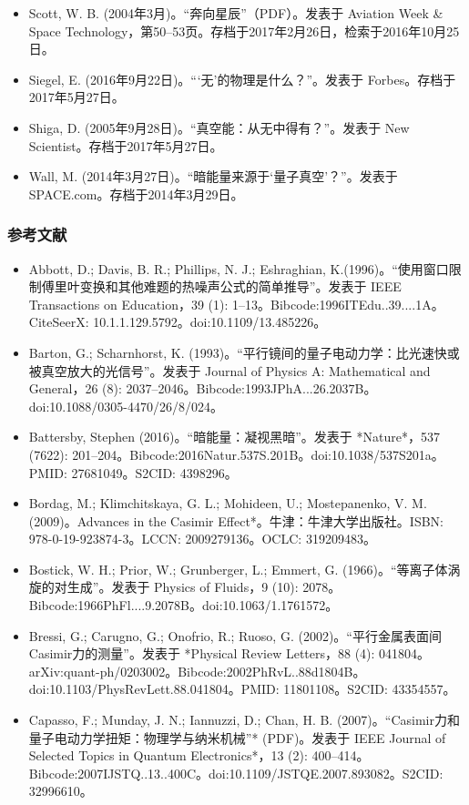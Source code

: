 \begin{itemize}
\item Scott, W. B. (2004年3月)。“奔向星辰”（PDF）。发表于 Aviation Week & Space Technology，第50–53页。存档于2017年2月26日，检索于2016年10月25日。
\item Siegel, E. (2016年9月22日)。“‘无’的物理是什么？”。发表于 Forbes。存档于2017年5月27日。
\item Shiga, D. (2005年9月28日)。“真空能：从无中得有？”。发表于 New Scientist。存档于2017年5月27日。
\item Wall, M. (2014年3月27日)。“暗能量来源于‘量子真空’？”。发表于 SPACE.com。存档于2014年3月29日。
\end{itemize}
\subsubsection{参考文献}
\begin{itemize}
\item Abbott, D.; Davis, B. R.; Phillips, N. J.; Eshraghian, K.(1996)。“使用窗口限制傅里叶变换和其他难题的热噪声公式的简单推导”。发表于 IEEE Transactions on Education，39 (1): 1–13。Bibcode:1996ITEdu..39....1A。CiteSeerX: 10.1.1.129.5792。doi:10.1109/13.485226。
\item Barton, G.; Scharnhorst, K. (1993)。“平行镜间的量子电动力学：比光速快或被真空放大的光信号”。发表于 Journal of Physics A: Mathematical and General，26 (8): 2037–2046。Bibcode:1993JPhA...26.2037B。doi:10.1088/0305-4470/26/8/024。
\item Battersby, Stephen (2016)。“暗能量：凝视黑暗”。发表于 *Nature*，537 (7622): 201–204。Bibcode:2016Natur.537S.201B。doi:10.1038/537S201a。PMID: 27681049。S2CID: 4398296。
\item Bordag, M.; Klimchitskaya, G. L.; Mohideen, U.; Mostepanenko, V. M. (2009)。Advances in the Casimir Effect*。牛津：牛津大学出版社。ISBN: 978-0-19-923874-3。LCCN: 2009279136。OCLC: 319209483。
\item Bostick, W. H.; Prior, W.; Grunberger, L.; Emmert, G. (1966)。“等离子体涡旋的对生成”。发表于 Physics of Fluids，9 (10): 2078。Bibcode:1966PhFl....9.2078B。doi:10.1063/1.1761572。
\item Bressi, G.; Carugno, G.; Onofrio, R.; Ruoso, G. (2002)。“平行金属表面间Casimir力的测量”。发表于 *Physical Review Letters，88 (4): 041804。arXiv:quant-ph/0203002。Bibcode:2002PhRvL..88d1804B。doi:10.1103/PhysRevLett.88.041804。PMID: 11801108。S2CID: 43354557。
\item Capasso, F.; Munday, J. N.; Iannuzzi, D.; Chan, H. B. (2007)。“Casimir力和量子电动力学扭矩：物理学与纳米机械”* (PDF)。发表于 IEEE Journal of Selected Topics in Quantum Electronics*，13 (2): 400–414。Bibcode:2007IJSTQ..13..400C。doi:10.1109/JSTQE.2007.893082。S2CID: 32996610。

\end{itemize}
